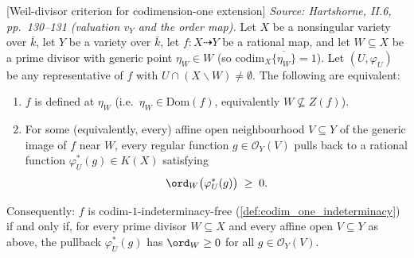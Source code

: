 \begin{theorem}

  [Weil-divisor criterion for codimension-one extension]
  \label{thm:weil_divisor_obstruction}
  \textit{Source: Hartshorne, II.6, pp.~130--131 (valuation \(v_Y\) and the order map).}
  Let \(X\) be a nonsingular variety over \(\bar k\), let \(Y\) be a variety over \(\bar k\),
  let \(f \colon X \dashrightarrow Y\) be a rational map, and let \(W \subseteq X\) be a
  prime divisor with generic point \(\eta_W \in W\) (so
  \(\mathrm{codim}_X \overline{\{\eta_W\}} = 1\)). Let \((U, \varphi_U)\) be any representative of
  \(f\) with \(U \cap (X \smallsetminus W) \neq \emptyset\). The following are equivalent:
  \begin{enumerate}
    \item \(f\) is defined at \(\eta_W\) (i.e.\ \(\eta_W \in \mathrm{Dom}(f)\), equivalently
      \(W \not\subseteq Z(f)\)).
    \item For some (equivalently, every) affine open neighbourhood \(V \subseteq Y\) of
      the generic image of \(f\) near \(W\), every regular function \(g \in
      \mathcal O_Y(V)\) pulls back to a rational function \(\varphi_U^\ast(g) \in K(X)\)
      satisfying
      \[
        \ord_W\bigl(\varphi_U^\ast(g)\bigr) \;\geq\; 0.
      \]
  \end{enumerate}

  Consequently: \(f\) is codim-\(1\)-indeterminacy-free
  (\cref{def:codim_one_indeterminacy}) if and only if, for every prime divisor
  \(W \subseteq X\) and every affine open \(V \subseteq Y\) as above, the pullback
  \(\varphi_U^\ast(g)\) has \(\ord_W \geq 0\) for all \(g \in \mathcal O_Y(V)\).
\end{theorem}

